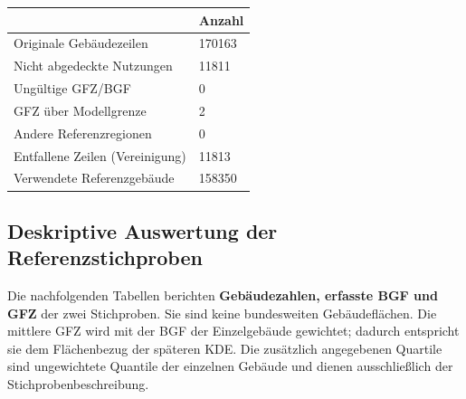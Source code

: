 \documentclass[
  ngerman,
  a4paper,
  DIV=11]{scrreprt}
\newcounter{none} %
\begin{document}
{\def\LTcaptype{none} %
\begin{longtable}[]{@{}ll@{}}
\toprule\noalign{}
& Anzahl \\
\midrule\noalign{}
\endhead
\bottomrule\noalign{}
\endlastfoot
Originale Gebäudezeilen & 170163 \\
Nicht abgedeckte Nutzungen & 11811 \\
Ungültige GFZ/BGF & 0 \\
GFZ über Modellgrenze & 2 \\
Andere Referenzregionen & 0 \\
Entfallene Zeilen (Vereinigung) & 11813 \\
Verwendete Referenzgebäude & 158350 \\
\end{longtable}
}

\subsection{Deskriptive Auswertung der
Referenzstichproben}\label{deskriptive-auswertung-der-referenzstichproben}

Die nachfolgenden Tabellen berichten \textbf{Gebäudezahlen, erfasste BGF
und GFZ} der zwei Stichproben. Sie sind keine bundesweiten
Gebäudeflächen. Die mittlere GFZ wird mit der BGF der Einzelgebäude
gewichtet; dadurch entspricht sie dem Flächenbezug der späteren KDE. Die
zusätzlich angegebenen Quartile sind ungewichtete Quantile der einzelnen
Gebäude und dienen ausschließlich der Stichprobenbeschreibung.
\end{document}
